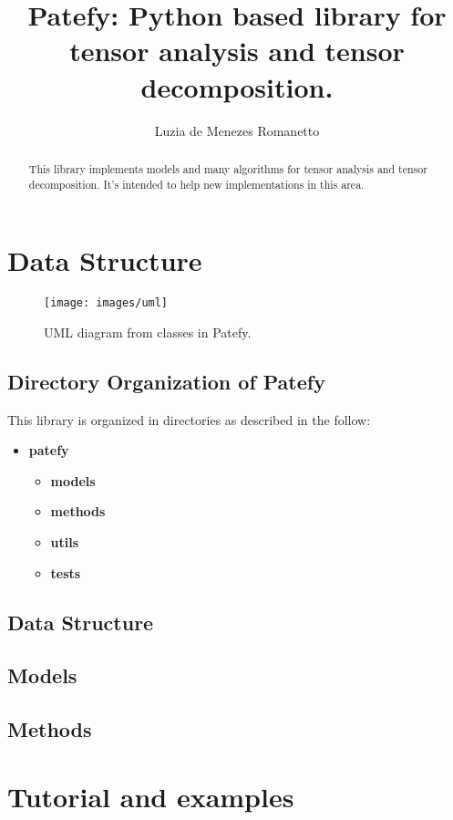 \documentclass[a4paper,10pt]{report}
\title{Patefy: Python based library for tensor analysis and tensor decomposition.}
\author{Luzia de Menezes Romanetto}
\begin{document}
\maketitle

\begin{abstract}
This library implements models and many algorithms for tensor analysis and tensor decomposition. It's intended to 
help new implementations in this area.
\end{abstract}

\chapter{Data Structure}

\begin{figure}[htbp]
	\begin{center}
		\texttt{[image: images/uml]}\\
		\caption{UML diagram from classes in Patefy.}
		\label{fig:TensorIdea}
	\end{center}
\end{figure}

\section{Directory Organization of Patefy}

This library is organized in directories as described in the follow:

\begin{itemize}
 \item \textbf{patefy}
 \begin{itemize}
  \item \textbf{models}
  \item \textbf{methods}
  \item \textbf{utils}
  \item \textbf{tests}
 \end{itemize}
\end{itemize}

\section{Data Structure}

\section{Models}

\section{Methods}

\chapter{Tutorial and examples}
\end{document}
